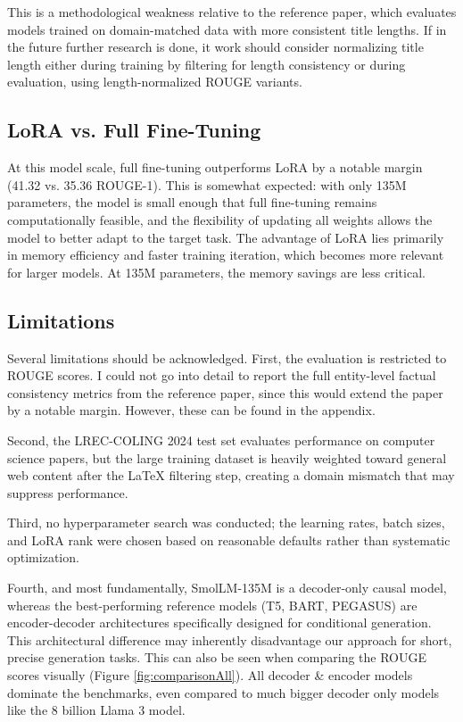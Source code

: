 \documentclass[12pt,conference]{IEEEtran}
\begin{document}
This is a methodological weakness relative to the reference paper, which evaluates models trained on domain-matched data with more consistent title lengths. If in the future further research is done, it work should consider normalizing title length either during training by filtering for length consistency or during evaluation, using length-normalized ROUGE variants.


\subsection{LoRA vs. Full Fine-Tuning}
At this model scale, full fine-tuning outperforms LoRA by a notable margin (41.32 vs. 35.36 ROUGE-1). This is somewhat expected: with only 135M parameters, the model is small enough that full fine-tuning remains computationally feasible, and the flexibility of updating all weights allows the model to better adapt to the target task. The advantage of LoRA lies primarily in memory efficiency and faster training iteration, which becomes more relevant for larger models. At 135M parameters, the memory savings are less critical.

\subsection{Limitations}
Several limitations should be acknowledged. First, the evaluation is restricted to ROUGE scores. I could not go into detail to report the full entity-level factual consistency metrics from the reference paper, since this would extend the paper by a notable margin. However, these can be found in the appendix. 

Second, the LREC-COLING 2024 test set evaluates performance on computer science papers, but the large training dataset is heavily weighted toward general web content after the LaTeX filtering step, creating a domain mismatch that may suppress performance. 

Third, no hyperparameter search was conducted; the learning rates, batch sizes, and LoRA rank were chosen based on reasonable defaults rather than systematic optimization. 

Fourth, and most fundamentally, SmolLM-135M is a decoder-only causal model, whereas the best-performing reference models (T5, BART, PEGASUS) are encoder-decoder architectures specifically designed for conditional generation. This architectural difference may inherently disadvantage our approach for short, precise generation tasks. This can also be seen when comparing the ROUGE scores visually (Figure \ref{fig:comparisonAll}). All decoder \& encoder models dominate the benchmarks, even compared to much bigger decoder only models like the 8 billion Llama 3 model.
\end{document}
